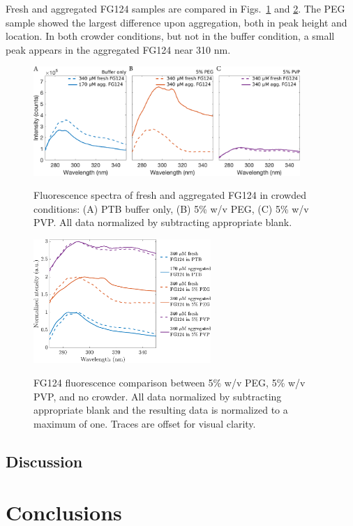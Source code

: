 Fresh and aggregated FG124 samples are compared in Figs.~\ref{fig:FG124-fresh-vs-agg} and \ref{fig:stacked-FG124-fluorimetry}.  The PEG sample showed the largest difference upon aggregation, both in peak height and location.  In both crowder conditions, but not in the buffer condition, a small peak appears in the aggregated FG124 near 310 nm.

\begin{figure}
\caption[FG124 fluorescence in crowded conditions.]{Fluorescence spectra of fresh and aggregated FG124 in crowded conditions: (A) PTB buffer only, (B) 5\% w/v PEG, (C) 5\% w/v PVP.  All data normalized by subtracting appropriate blank.}
\centering
\includegraphics[width=0.9\textwidth]{figs/ch05/FG124-fresh-vs-agg.pdf}
\label{fig:FG124-fresh-vs-agg}
\end{figure}

\begin{figure}
\caption[FG124 fluorescence comparison between crowding agents.]{FG124 fluorescence comparison between 5\% w/v PEG, 5\% w/v PVP, and no crowder.  All data normalized by subtracting appropriate blank and the resulting data is normalized to a maximum of one.  Traces are offset for visual clarity.\\}
\centering
\includegraphics[width=0.6\textwidth]{figs/ch05/stacked-FG124-fluorimetry.pdf}
\label{fig:stacked-FG124-fluorimetry}
\end{figure}

\subsection{Discussion}

\section{Conclusions}


